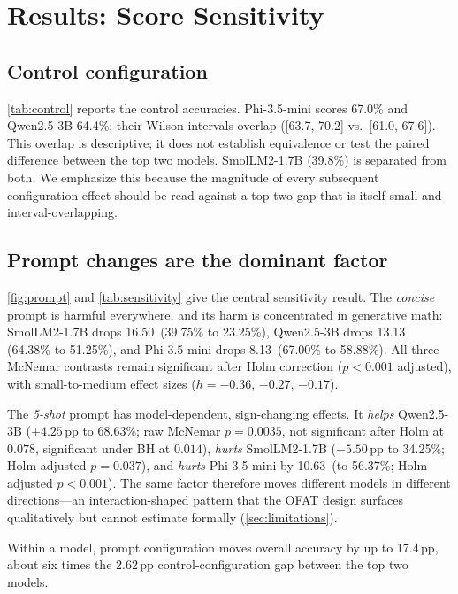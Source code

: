 
\section{Results: Score Sensitivity}
\label{sec:results}

\subsection{Control configuration}
\label{sec:control}

\cref{tab:control} reports the control accuracies. Phi-3.5-mini scores
67.0\% and Qwen2.5-3B 64.4\%; their Wilson intervals overlap
([63.7, 70.2] vs.\ [61.0, 67.6]). This overlap is descriptive;
it does not establish equivalence or test the paired difference between
the top two models. SmolLM2-1.7B (39.8\%) is separated from both. We
emphasize this because the magnitude of every subsequent configuration
effect should be read against a top-two gap that is itself small and
interval-overlapping.

\subsection{Prompt changes are the dominant factor}

\cref{fig:prompt} and \cref{tab:sensitivity} give the central
sensitivity result. The \emph{concise} prompt is harmful everywhere,
and its harm is concentrated in generative math: SmolLM2-1.7B drops
16.50\,\pp{} (39.75\% to 23.25\%), Qwen2.5-3B drops 13.13\,\pp{}
(64.38\% to 51.25\%), and Phi-3.5-mini drops 8.13\,\pp{} (67.00\% to
58.88\%). All three McNemar contrasts remain significant after Holm
correction ($p<0.001$ adjusted), with small-to-medium effect sizes
($h=-0.36$, $-0.27$, $-0.17$).

The \emph{5-shot} prompt has model-dependent, sign-changing effects. It
\emph{helps} Qwen2.5-3B ($+4.25$\,pp{} to 68.63\%; raw McNemar
$p=0.0035$, not significant after Holm at $0.078$, significant under BH
at $0.014$), \emph{hurts} SmolLM2-1.7B ($-5.50$\,pp{} to 34.25\%;
Holm-adjusted $p=0.037$), and \emph{hurts} Phi-3.5-mini by
10.63\,\pp{} (to 56.37\%; Holm-adjusted $p<0.001$). The same factor
therefore moves different models in different directions---an
interaction-shaped pattern that the OFAT design surfaces qualitatively
but cannot estimate formally (\cref{sec:limitations}).

Within a model, prompt configuration moves overall accuracy by up to
17.4\,pp, about six times the 2.62\,pp control-configuration gap
between the top two models.
